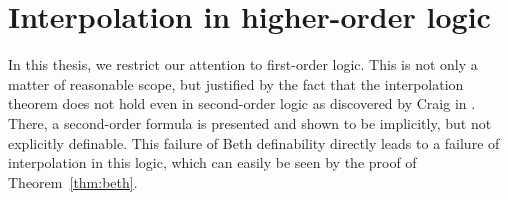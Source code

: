 \section{Interpolation in higher-order logic}
\label{sec:interpol_hol}
In this thesis, we restrict our attention to first-order logic.
This is not only a matter of reasonable scope, but justified by the fact that the interpolation theorem does not hold even in second-order logic as discovered by Craig in \cite{Craig65}.
There, a second-order formula is presented and shown to be implicitly, but not explicitly definable.
This failure of Beth definability directly leads to a failure of interpolation in this logic, which can easily be seen by the proof of Theorem~\ref{thm:beth}.



